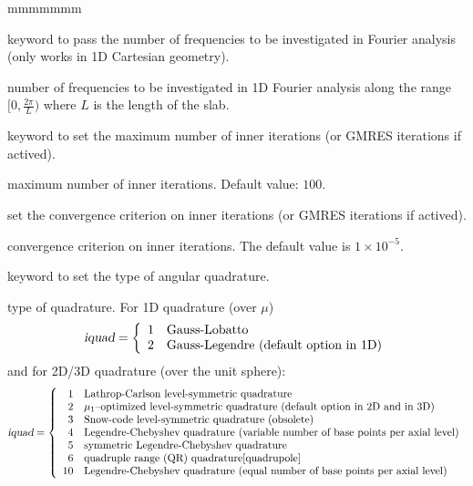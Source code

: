 \begin{ListeDeDescription}{mmmmmmm}
\item[\moc{FOUR}] keyword to pass the number of frequencies to be investigated in Fourier analysis (only works in 1D Cartesian geometry).
\item[\dusa{nfou}] number of frequencies to be investigated in 1D Fourier analysis along the range $[0, \frac{2\pi}{L})$ where $L$ is the length of the slab.

\item[\moc{MAXI}] keyword to set the maximum number of inner iterations (or GMRES iterations if actived).
\item[\dusa{maxi}] maximum number of inner iterations. Default value: $100$.

\item[\moc{EPSI}] set the convergence criterion on inner iterations (or GMRES iterations if actived).
\item[\dusa{epsi}] convergence criterion on inner iterations. The default value is $1\times 10^{-5}$.
\item[\moc{QUAD}] keyword to set the type of angular quadrature.

\item[\dusa{iquad}] type of quadrature. For 1D quadrature (over $\mu$)
\begin{displaymath}
    \dusa{iquad} = \left\{
    \begin{array}{rl}
        1 & \textrm{Gauss-Lobatto} \\
        2 & \textrm{Gauss-Legendre (default option in 1D)} \\
    \end{array} \right.
\end{displaymath}
and for 2D/3D quadrature (over the unit sphere):
\begin{displaymath}
    \dusa{iquad} = \left\{
    \begin{array}{rl}
        1 & \textrm{Lathrop-Carlson level-symmetric quadrature} \\
        2 & \textrm{$\mu_1$--optimi\-zed level-symmetric quadrature (default option in 2D and in 3D)} \\
        3 & \textrm{Snow-code level-symmetric quadrature (obsolete)} \\
        4 & \textrm{Legendre-Chebyshev quadrature (variable number of base points per axial level)} \\
        5 & \textrm{symmetric Legendre-Chebyshev quadrature} \\
        6 & \textrm{quadruple range (QR) quadrature\cite{quadrupole}} \\
        10 & \textrm{Legendre-Chebyshev quadrature (equal number of base points per axial level)} \\
    \end{array} \right.
\end{displaymath}


\end{ListeDeDescription}
